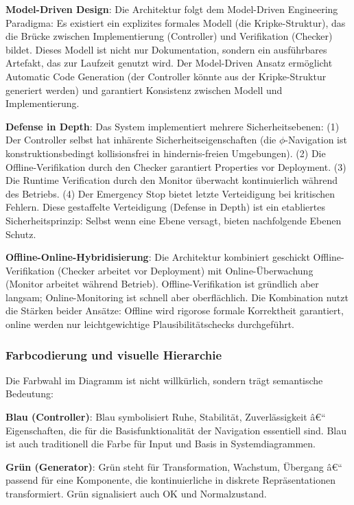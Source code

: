 ﻿\documentclass[a4paper,12pt]{article}
\theoremstyle{definition}
\begin{document}
\textbf{Model-Driven Design}: Die Architektur folgt dem Model-Driven Engineering Paradigma: Es existiert ein explizites formales Modell (die Kripke-Struktur), das die Brücke zwischen Implementierung (Controller) und Verifikation (Checker) bildet. Dieses Modell ist nicht nur Dokumentation, sondern ein ausführbares Artefakt, das zur Laufzeit genutzt wird. Der Model-Driven Ansatz ermöglicht Automatic Code Generation (der Controller könnte aus der Kripke-Struktur generiert werden) und garantiert Konsistenz zwischen Modell und Implementierung.

\textbf{Defense in Depth}: Das System implementiert mehrere Sicherheitsebenen: (1) Der Controller selbst hat inhärente Sicherheitseigenschaften (die $\phi$-Navigation ist konstruktionsbedingt kollisionsfrei in hindernis-freien Umgebungen). (2) Die Offline-Verifikation durch den Checker garantiert Properties vor Deployment. (3) Die Runtime Verification durch den Monitor überwacht kontinuierlich während des Betriebs. (4) Der Emergency Stop bietet letzte Verteidigung bei kritischen Fehlern. Diese gestaffelte Verteidigung (Defense in Depth) ist ein etabliertes Sicherheitsprinzip: Selbst wenn eine Ebene versagt, bieten nachfolgende Ebenen Schutz.

\textbf{Offline-Online-Hybridisierung}: Die Architektur kombiniert geschickt Offline-Veri\-fikation (Checker arbeitet vor Deployment) mit Online-Überwachung (Monitor arbeitet während Betrieb). Offline-Veri\-fi\-kation ist gründlich aber langsam; Online-Monitoring ist schnell aber oberflächlich. Die Kombination nutzt die Stärken beider Ansätze: Offline wird rigorose formale Korrektheit garantiert, online werden nur leichtgewichtige Plausibilitätschecks durchgeführt.

\subsubsection{Farbcodierung und visuelle Hierarchie}

Die Farbwahl im Diagramm ist nicht willkürlich, sondern trägt semantische Bedeutung:

\textbf{Blau (Controller)}: Blau symbolisiert Ruhe, Stabilität, Zuverlässigkeit â€“ Eigenschaften, die für die Basisfunktionalität der Navigation essentiell sind. Blau ist auch traditionell die Farbe für Input und Basis in Systemdiagrammen.

\textbf{Grün (Generator)}: Grün steht für Transformation, Wachstum, Übergang â€“ passend für eine Komponente, die kontinuierliche in diskrete Repräsentationen transformiert. Grün signalisiert auch OK und Normalzustand.
\end{document}
